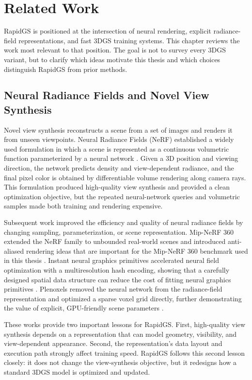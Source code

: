 \chapter{Related Work}
\label{chap:related-work}

RapidGS is positioned at the intersection of neural rendering, explicit radiance-field representations, and fast 3DGS training systems. This chapter reviews the work most relevant to that position. The goal is not to survey every 3DGS variant, but to clarify which ideas motivate this thesis and which choices distinguish RapidGS from prior methods.

\section{Neural Radiance Fields and Novel View Synthesis}

Novel view synthesis reconstructs a scene from a set of images and renders it from unseen viewpoints. Neural Radiance Fields (NeRF) established a widely used formulation in which a scene is represented as a continuous volumetric function parameterized by a neural network \cite{MildenhallECCV2020NeRF}. Given a 3D position and viewing direction, the network predicts density and view-dependent radiance, and the final pixel color is obtained by differentiable volume rendering along camera rays. This formulation produced high-quality view synthesis and provided a clean optimization objective, but the repeated neural-network queries and volumetric samples made both training and rendering expensive.

Subsequent work improved the efficiency and quality of neural radiance fields by changing sampling, parameterization, or scene representation. Mip-NeRF 360 extended the NeRF family to unbounded real-world scenes and introduced anti-aliased rendering ideas that are important for the Mip-NeRF 360 benchmark used in this thesis \cite{BarronCVPR2022MipNeRF360}. Instant neural graphics primitives accelerated neural field optimization with a multiresolution hash encoding, showing that a carefully designed spatial data structure can reduce the cost of fitting neural graphics primitives \cite{MullerTOG2022InstantNGP}. Plenoxels removed the neural network from the radiance-field representation and optimized a sparse voxel grid directly, further demonstrating the value of explicit, GPU-friendly scene parameters \cite{FridovichKeilCVPR2022Plenoxels}.

These works provide two important lessons for RapidGS. First, high-quality view synthesis depends on a representation that can model geometry, visibility, and view-dependent appearance. Second, the representation's data layout and execution path strongly affect training speed. RapidGS follows this second lesson closely: it does not change the view-synthesis objective, but it redesigns how a standard 3DGS model is optimized and updated.

